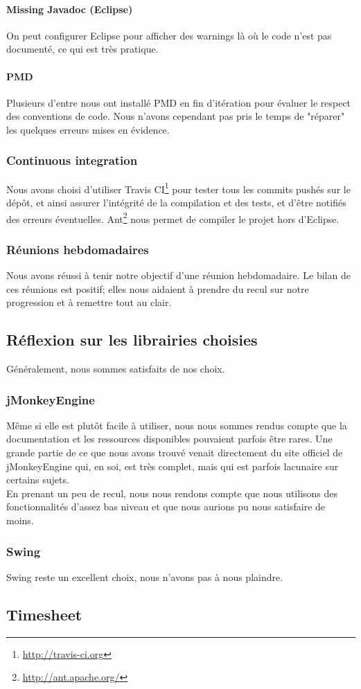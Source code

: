 	\paragraph{Missing Javadoc (Eclipse)}
	On peut configurer Eclipse pour afficher des warnings là où le code n'est
	pas documenté, ce qui est très pratique.

	\paragraph{PMD}
	Plusieurs d'entre nous ont installé PMD en fin d'itération pour évaluer le
	respect des conventions de code. Nous n'avons cependant pas pris le temps
	de "réparer" les quelques erreurs mises en évidence.

	\subsubsection{Continuous integration}
	Nous avons choisi d'utiliser Travis CI\footnote{\url{http://travis-ci.org}}
	pour tester tous les commits pushés sur le dépôt, et ainsi assurer
	l'intégrité de la compilation et des tests, et d'être notifiés des erreurs
	éventuelles. Ant\footnote{\url{http://ant.apache.org/}} nous permet de
	compiler le projet hors d'Eclipse.

	\subsubsection{Réunions hebdomadaires}
	Nous avons réussi à tenir notre objectif d'une réunion hebdomadaire. Le 
	bilan de ces réunions est positif; elles nous aidaient à prendre du 
	recul sur notre progression et à remettre tout au clair. 

\subsection{Réflexion sur les librairies choisies}

	Généralement, nous sommes satisfaits de nos choix.

	\subsubsection{jMonkeyEngine}
	Même si elle est plutôt facile à utiliser, nous nous sommes rendus compte
	que la documentation et les ressources disponibles pouvaient parfois être
	rares. Une grande partie de ce que nous avons trouvé venait directement 
	du site officiel de jMonkeyEngine qui, en soi, est très complet, mais qui
	est parfois lacunaire sur certains sujets.\\

	En prenant un peu de recul, nous nous rendons compte que nous utilisons
	des fonctionnalités d'assez bas niveau et que nous aurions pu nous 
	satisfaire de moins.

	\subsubsection{Swing}
	Swing reste un excellent choix, nous n'avons pas à nous plaindre.

\subsection{Timesheet}

